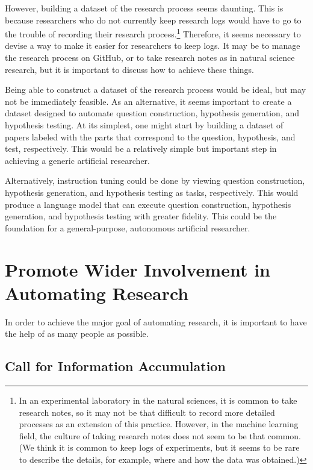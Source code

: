 However, building a dataset of the research process seems daunting. This is because researchers who do not currently keep research logs would have to go to the trouble of recording their research process.\footnote{
In an experimental laboratory in the natural sciences, it is common to take research notes, so it may not be that difficult to record more detailed processes as an extension of this practice. However, in the machine learning field, the culture of taking research notes does not seem to be that common. (We think it is common to keep logs of experiments, but it seems to be rare to describe the details, for example, where and how the data was obtained.) 
} Therefore, it seems necessary to devise a way to make it easier for researchers to keep logs. It may be to manage the research process on GitHub, or to take research notes as in natural science research, but it is important to discuss how to achieve these things.

Being able to construct a dataset of the research process would be ideal, but may not be immediately feasible. As an alternative, it seems important to create a dataset designed to automate question construction, hypothesis generation, and hypothesis testing. At its simplest, one might start by building a dataset of papers labeled with the parts that correspond to the question, hypothesis, and test, respectively. This would be a relatively simple but important step in achieving a generic artificial researcher.

Alternatively, instruction tuning could be done by viewing question construction, hypothesis generation, and hypothesis testing as tasks, respectively. This would produce a language model that can execute question construction, hypothesis generation, and hypothesis testing with greater fidelity. This could be the foundation for a general-purpose, autonomous artificial researcher.

\section{Promote Wider Involvement in Automating Research}
In order to achieve the major goal of automating research, it is important to have the help of as many people as possible.


\subsection{Call for Information Accumulation}

